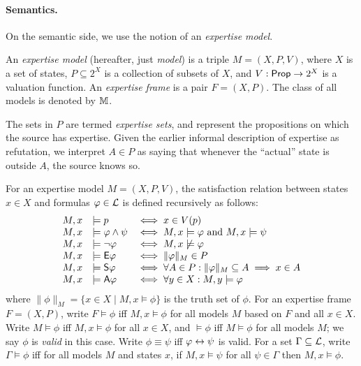 \paragraph{Semantics.}

On the semantic side, we use the notion of an \emph{expertise model}.

\begin{definition}
    \label{exp_def_expertise_model}

    An \emph{expertise model} (hereafter, just \emph{model})
    is a triple $M = (X, P, V)$, where $X$ is a set
    of states, $P \subseteq 2^X$ is a collection of subsets of $X$, and $V:
    \mathsf{Prop} \to 2^X$ is a valuation function. An \emph{expertise frame} is a pair
    $F = (X, P)$.  The class of all models is denoted by $\mathbb{M}$.

\end{definition}

The sets in $P$ are termed \emph{expertise sets}, and represent the
propositions on which the source has expertise. Given the earlier informal
description of expertise as refutation, we interpret $A \in P$ as saying
that whenever the ``actual'' state is outside $A$, the source knows so.

For an expertise model $M = (X, P, V)$, the satisfaction relation between
states $x \in X$ and formulas $\varphi \in \mathcal{L}$ is defined recursively
as follows:
\[
    \begin{array}{lll}
     M, x &\models p &\iff x \in V(p) \\
     M, x &\models \varphi \land \psi &\iff M, x \models \varphi \text{ and } M, x
         \models \psi \\
     M, x &\models \neg\varphi &\iff M, x \not\models \varphi \\
     M, x &\models \mathsf{E}\varphi &\iff \|\varphi\|_M \in P \\
     M, x &\models \mathsf{S}\varphi &\iff \forall A \in P: \|\varphi\|_M \subseteq A \implies
         x \in A \\
     M, x &\models \mathsf{A}\varphi &\iff \forall y \in X: M, y \models \varphi
    \end{array}
\]
where $\|\phi\|_M = \{x \in X \mid M, x \models \phi\}$ is the truth set
of $\phi$. For an expertise frame $F = (X, P)$, write $F
\models \phi$ iff $M, x \models \phi$ for all models $M$ based on
$F$ and all $x \in X$. Write $M \models \phi$ iff
$M, x \models \phi$ for all $x \in X$, and $\models \phi$ iff
$M \models \phi$ for all models $M$; we say $\phi$ is \emph{valid}
in this case. Write $\phi \equiv \psi$ iff $\varphi \leftrightarrow \psi$ is
valid. For a set $\Gamma \subseteq \mathcal{L}$, write $\Gamma \models
\phi$ iff for all models $M$ and states $x$, if $M, x \models
\psi$ for all $\psi \in \Gamma$ then $M, x \models \phi$.

